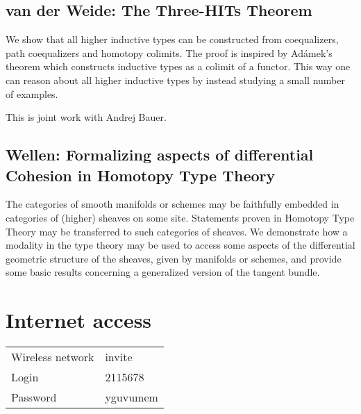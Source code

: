 \documentclass[a4paper,10pt]{scrartcl}
\begin{document}
\subsection*{van der Weide: The Three-HITs Theorem}

We show that all higher inductive types can be constructed from coequalizers, path coequalizers and homotopy colimits. The proof is inspired by Adámek's theorem which constructs inductive types as a colimit of a functor. This way one can reason about all higher inductive types by instead studying a small number of examples.

This is joint work with Andrej Bauer.

\subsection*{Wellen: Formalizing aspects of differential Cohesion in Homotopy Type Theory}

The categories of smooth manifolds or schemes may be faithfully embedded in categories of (higher) sheaves on some site. Statements proven in Homotopy Type Theory may be transferred to such categories of sheaves.
We demonstrate how a modality in the type theory may be used to access some aspects of the differential geometric structure of the sheaves, given by manifolds or schemes, and provide some basic results concerning a generalized version of the tangent bundle.


\section*{Internet access}
  
  \begin{center}
\begin{tabular}{ll}
Wireless network & invite \\
Login & 2115678 \\
Password & yguvumem
  \end{tabular}
  \end{center}
\end{document}
